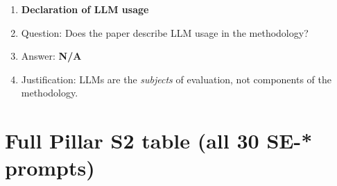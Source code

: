 \documentclass{article}
\providecommand{\answerNA}[1][]{\textbf{N/A}}
\begin{document}
\begin{enumerate}
\item {\bf Declaration of LLM usage}
    \item[] Question: Does the paper describe LLM usage in the methodology?
    \item[] Answer: \answerNA{}
    \item[] Justification: LLMs are the \emph{subjects} of evaluation, not components of the methodology.

\end{enumerate}

\appendix

\section{Full Pillar S2 table (all 30 SE-* prompts)}
\label{app:s2}
\end{document}
